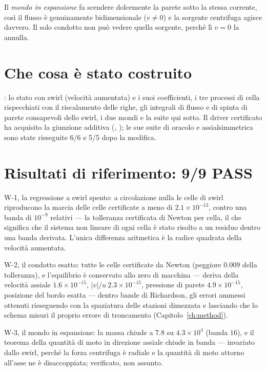 Il \emph{mondo in espansione} fa scendere dolcemente la parete sotto
la stessa corrente, così il flusso è genuinamente bidimensionale
($v \neq 0$) e la sorgente centrifuga agisce davvero. Il solo
condotto non può vedere quella sorgente, perché lì $v = 0$ la
annulla.

\section{Che cosa è stato costruito}

: lo stato con swirl
(velocità aumentata) e i suoi coefficienti, i tre processi di cella
rispecchiati con il riscalamento delle righe, gli integrali di flusso
e di spinta di parete consapevoli dello swirl, i due mondi e la suite
qui sotto. Il driver certificato ha acquisito la giunzione additiva
(, ); le sue suite di oracolo e
assialsimmetrica sono state rieseguite 6/6 e 5/5 dopo la modifica.

\section{Risultati di riferimento: 9/9 PASS}

W-1, la regressione a swirl spento: a circolazione nulla le celle di
swirl riproducono la marcia delle celle certificate a meno di
$2.1\times10^{-13}$, contro una banda di $10^{-9}$ relativi --- la
tolleranza certificata di Newton per cella, il che significa che il
sistema non lineare di ogni cella è stato risolto a un residuo dentro
una banda derivata. L'unica differenza aritmetica è la radice
quadrata della velocità aumentata.

W-2, il condotto esatto: tutte le celle certificate da Newton
(peggiore $0.009$ della tolleranza), e l'equilibrio è conservato allo
zero di macchina --- deriva della velocità assiale
$1.6\times10^{-15}$, $|v|/u\ 2.3\times10^{-15}$, pressione di parete
$4.9\times10^{-15}$, posizione del bordo esatta --- dentro bande di
Richardson, gli errori ammessi ottenuti rieseguendo con la spaziatura
delle stazioni dimezzata e lasciando che lo schema misuri il proprio
errore di troncamento (Capitolo~\ref{ch:method}).

W-3, il mondo in espansione: la massa chiude a $7.8$ su
$4.3\times10^{4}$ (banda $16$), e il teorema della quantità di moto
in direzione assiale chiude in banda --- invariato dallo swirl,
perché la forza centrifuga è radiale e la quantità di moto attorno
all'asse ne è disaccoppiata; verificato, non assunto.

